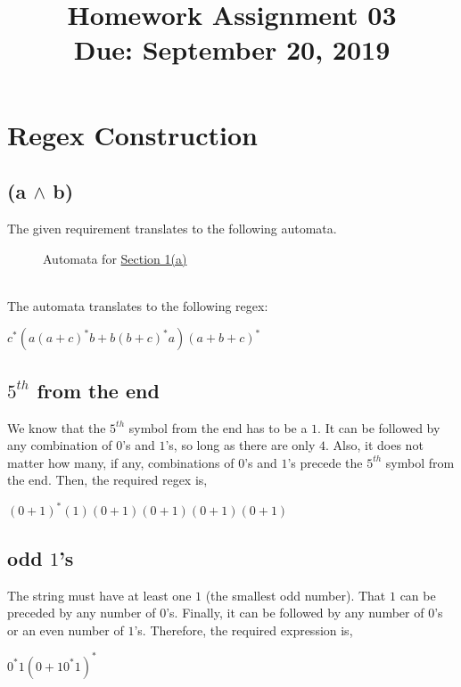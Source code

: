 \documentclass[11pt,letterpaper]{article}
\title{Homework Assignment 03 \\
    \small Due: September 20, 2019 }
\begin{document}
\maketitle

\section{Regex Construction}

\subsection{(a $\wedge$ b)}
\label{sec:1a}
The given requirement translates to the following automata.
\begin{figure}[!ht]
\label{fig:1a}
\centering
{}
\caption{Automata for \hyperref[sec:1a]{Section 1(a)}}
\end{figure}
\\The automata translates to the following regex:
\begin{center}
    $ c^*(a(a+c)^*b + b(b+c)^*a)(a+b+c)^* $
\end{center}

\subsection{$5^{th}$ from the end}
We know that the $5^{th}$ symbol from the end has to be a $1$. It can be followed by any combination of $0$'s and $1$'s, so long as there are only $4$. Also, it does not matter how many, if any, combinations of $0$'s and $1$'s precede the $5^{th}$ symbol from the end. Then, the required regex is,
\begin{center}
    $ (0 + 1)^*(1)(0+1)(0+1)(0+1)(0+1) $
\end{center}

\subsection{odd $1$'s}
The string must have at least one $1$ (the smallest odd number). That $1$ can be preceded by any number of $0$'s. Finally, it can be followed by any number of $0$'s or an even number of $1$'s. Therefore, the required expression is,
\begin{center}
    $ 0^*1(0 + 10^*1)^* $
\end{center}
\end{document}
